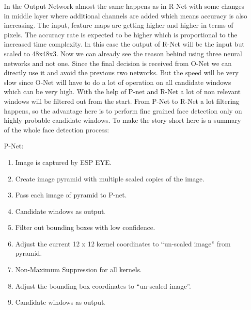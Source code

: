 In the Output Network almost the same happens as in R-Net with some changes in middle layer where additional channels are added which means accuracy is also increasing. The input, feature maps are getting higher and higher in terms of pixels. The accuracy rate is expected to be higher which is proportional to the increased time complexity. In this case the output of R-Net will be the input but scaled to 48x48x3. 
Now we can already see the reason behind using three neural networks and not one. Since the final decision is received from O-Net we can directly use it and avoid the previous two networks. But the speed will be very slow since O-Net will have to do a lot of operation on all candidate windows which can be very high. With the help of P-net and R-Net a lot of non relevant windows will be filtered out from the start. From P-Net to R-Net a lot filtering happens, so the advantage here is to perform fine grained face detection only on highly probable candidate windows. To make the story short here is a summary of the whole face detection process: 
 
 P-Net:
\begin{enumerate}
  \vspace{-0.7cm} \item Image is captured by ESP EYE.
  \vspace{-0.3cm}\item Create image pyramid with multiple scaled copies of the image.
  \vspace{-0.3cm} \item Pass each image of pyramid to P-net.
  \vspace{-0.3cm} \item Candidate windows as output.
  \vspace{-0.3cm} \item Filter out bounding boxes with low confidence.
  \vspace{-0.3cm} \item Adjust the current 12 x 12 kernel coordinates to “un-scaled image” from pyramid.
  \vspace{-0.3cm} \item Non-Maximum Suppression for all kernels.
   \vspace{-0.3cm} \item Adjust the bounding box coordinates to “un-scaled image”.
   \vspace{-0.3cm} \item Candidate windows as output.
\end{enumerate}

